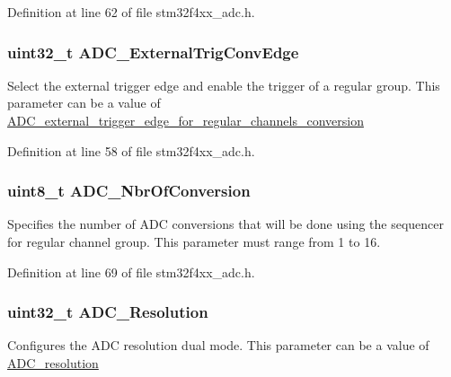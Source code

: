 Definition at line 62 of file stm32f4xx\-\_\-adc.\-h.

\hypertarget{struct_a_d_c___init_type_def_a4243ef59cd2e57d4ea4ed8e0d7451ea0}{
\subsubsection[{A\-D\-C\-\_\-\-External\-Trig\-Conv\-Edge}]{\setlength{\rightskip}{0pt plus 5cm}uint32\-\_\-t A\-D\-C\-\_\-\-External\-Trig\-Conv\-Edge}}\label{struct_a_d_c___init_type_def_a4243ef59cd2e57d4ea4ed8e0d7451ea0}
Select the external trigger edge and enable the trigger of a regular group. This parameter can be a value of \hyperlink{group___a_d_c__external__trigger__edge__for__regular__channels__conversion}{A\-D\-C\-\_\-external\-\_\-trigger\-\_\-edge\-\_\-for\-\_\-regular\-\_\-channels\-\_\-conversion} 

Definition at line 58 of file stm32f4xx\-\_\-adc.\-h.

\hypertarget{struct_a_d_c___init_type_def_a2b480f62e18149cf047c1028cf5a4d5c}{
\subsubsection[{A\-D\-C\-\_\-\-Nbr\-Of\-Conversion}]{\setlength{\rightskip}{0pt plus 5cm}uint8\-\_\-t A\-D\-C\-\_\-\-Nbr\-Of\-Conversion}}\label{struct_a_d_c___init_type_def_a2b480f62e18149cf047c1028cf5a4d5c}
Specifies the number of A\-D\-C conversions that will be done using the sequencer for regular channel group. This parameter must range from 1 to 16. 

Definition at line 69 of file stm32f4xx\-\_\-adc.\-h.

\hypertarget{struct_a_d_c___init_type_def_ae6309271617f7a67c7428d2b6c4c63b0}{
\subsubsection[{A\-D\-C\-\_\-\-Resolution}]{\setlength{\rightskip}{0pt plus 5cm}uint32\-\_\-t A\-D\-C\-\_\-\-Resolution}}\label{struct_a_d_c___init_type_def_ae6309271617f7a67c7428d2b6c4c63b0}
Configures the A\-D\-C resolution dual mode. This parameter can be a value of \hyperlink{group___a_d_c__resolution}{A\-D\-C\-\_\-resolution} 

